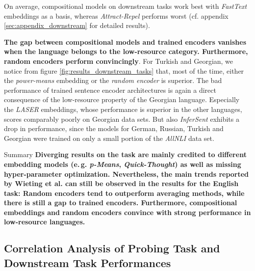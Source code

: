  On average, compositional models on downstream tasks work best with \textit{FastText} embeddings as a basis, whereas \textit{Attract-Repel} performs worst (cf. appendix \vref{sec:appendix_downstream} for detailed results).

 \textbf{The gap between compositional models and trained encoders vanishes when the language belongs to the low-resource category. Furthermore, random encoders perform convincingly}. For Turkish and Georgian, we notice from figure \vref{fig:results_downstream_tasks} that, most of the time, either the \textit{power-means} embedding or the \textit{random encoder} is superior. The bad performance of trained sentence encoder architectures is again a direct consequence of the low-resource property of the Georgian language. Especially the \textit{LASER} embeddings, whose performance is superior in the other languages, scores comparably poorly on Georgian data sets. But also \textit{InferSent} exhibits a drop in performance, since the models for German, Russian, Turkish and Georgian were trained on only a small portion of the \textit{AllNLI} data set.

\begin{tudbox}{Summary}
	\textbf{Diverging results on the  task are mainly credited to different embedding models (e.\,g. \textit{p-Means}, \textit{Quick-Thought})
	as well as missing hyper-parameter optimization. Nevertheless, the main trends reported by Wieting et al. can still be observed in the results for the English  task:
 	Random encoders tend to outperform averaging methods, while there is still a gap to trained encoders. Furthermore, compositional embeddings and
	random encoders convince with strong performance in low-resource languages.}
\end{tudbox}

\subsection{Correlation Analysis of Probing Task and Downstream Task Performances}
\label{sec:correlation_probing_downstream_tasks}

